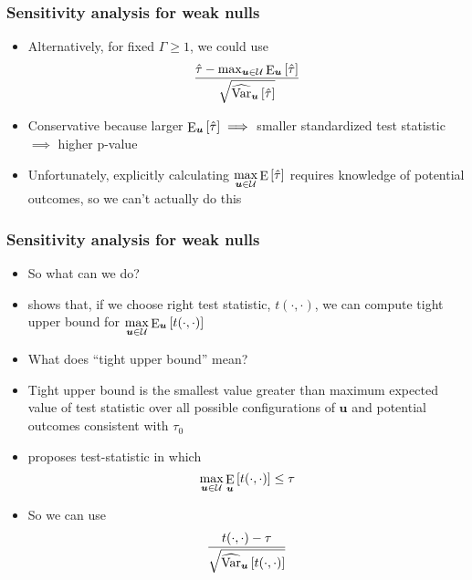\documentclass[table, xcolor = {dvipsnames}, 9pt]{beamer}
\theoremstyle{plain}
\DeclareMathOperator{\E}{\rm{E}}
\DeclareMathOperator{\Var}{\rm{Var}}
\begin{document}
\begin{frame}[t]
\frametitle{Sensitivity analysis for weak nulls} 
\vfill
\begin{itemize} \vfill
\item Alternatively, for fixed $\Gamma \geq 1$, we could use
\begin{equation}
\dfrac{\hat{\tau} - \max_{\bm{u} \in \mathcal{U}} \E_{\bm{u}}\left[\hat{\tau}\right]}{\sqrt{\widehat{\Var}_{\bm{u}}\left[\hat{\tau}\right]}}
\end{equation}
\item Conservative because larger $\E_{\bm{u}}\left[\hat{\tau}\right] \implies $ smaller standardized test statistic $\implies$ higher p-value \vfill
\item Unfortunately, explicitly calculating $\max \limits_{\bm{u} \in \mathcal{U}} \E\left[\hat{\tau}\right]$ requires knowledge of potential outcomes, so we can't actually do this \vfill
\end{itemize}  
\vfill
\end{frame}
\begin{frame}[t]
\frametitle{Sensitivity analysis for weak nulls} 
\vfill
\begin{itemize} \vfill
\item So what can we do? \vfill
\item \citet{fogarty2020} shows that, if we choose right test statistic, $t(\cdot, \cdot)$, we can compute tight upper bound for $\max \limits_{\bm{u} \in \mathcal{U}} \E_{\bm{u}}\left[t(\cdot, \cdot)\right]$ \vfill
\item What does ``tight upper bound'' mean? \vfill
\item Tight upper bound is the smallest value greater than maximum expected value of test statistic over all possible configurations of $\bm{u}$ and potential outcomes consistent with $\tau_0$ \vfill
\item \citet{fogarty2020} proposes test-statistic in which
\begin{equation*}
\max \limits_{\bm{u} \in \mathcal{U}} \E_{\bm{u}}\left[t(\cdot, \cdot)\right] \leq \tau
\end{equation*}
\item So we can use
\begin{equation}
\dfrac{t(\cdot, \cdot) - \tau}{\sqrt{\widehat{\Var}_{\bm{u}}\left[t(\cdot, \cdot)\right]}}
\end{equation}
\end{itemize}  
\vfill
\end{frame}
\end{document}
